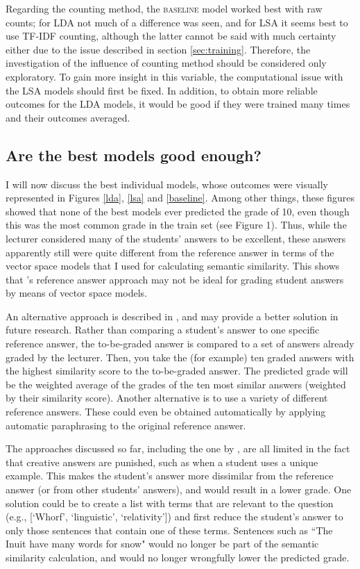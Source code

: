 \documentclass[a4paper,10pt,twoside]{article}
\begin{document}
Regarding the counting method, the \textsc{baseline} model worked best with raw counts; for LDA not much of a difference was seen, and for LSA it seems best to use TF-IDF counting, although the latter cannot be said with much certainty either due to the issue described in section \ref{sec:training}. Therefore, the investigation of the influence of counting method should be considered only exploratory. To gain more insight in this variable, the computational issue with the LSA models should first be fixed. In addition, to obtain more reliable outcomes for the LDA models, it would be good if they were trained many times and their outcomes averaged. 

\subsection{Are the best models good enough?}
I will now discuss the best individual models, whose outcomes were visually represented in Figures \ref{lda}, \ref{lsa} and \ref{baseline}. Among other things, these figures showed that none of the best models ever predicted the grade of 10, even though this was the most common grade in the train set (see Figure 1). Thus, while the lecturer considered many of the students' answers to be excellent, these answers apparently still were quite different from the reference answer in terms of the vector space models that I used for calculating semantic similarity. This shows that 's reference answer approach may not be ideal for grading student answers by means of vector space models.

An alternative approach is described in , and may provide a better solution in future research. Rather than comparing a student's answer to one specific reference answer, the to-be-graded answer is compared to a set of answers already graded by the lecturer. Then, you take the (for example) ten graded answers with the highest similarity score to the to-be-graded answer. The predicted grade will be the weighted average of the grades of the ten most similar answers (weighted by their similarity score). Another alternative is to use a variety of different reference answers. These could even be obtained automatically by applying automatic paraphrasing to the original reference answer.

The approaches discussed so far, including the one by , are all limited in the fact that creative answers are punished, such as when a student uses a unique example. This makes the student's answer more dissimilar from the reference answer (or from other students' answers), and would result in a lower grade. One solution could be to create a list with terms that are relevant to the question (e.g., [`Whorf', `linguistic', `relativity']) and first reduce the student's answer to only those sentences that contain one of these terms. Sentences such as ``The Inuit have many words for snow" would no longer be part of the semantic similarity calculation, and would no longer wrongfully lower the predicted grade.
\end{document}
